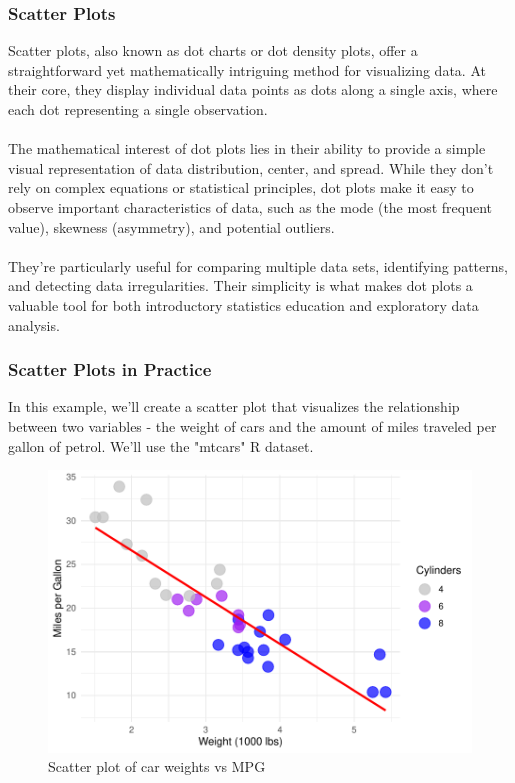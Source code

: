 \documentclass{article}\usepackage[]{graphicx}\usepackage[]{xcolor}
\makeatletter
\def\maxwidth{ %
  \ifdim\Gin@nat@width>\linewidth
    \linewidth
  \else
    \Gin@nat@width
  \fi
}
\newenvironment{kframe}{%
 \def\at@end@of@kframe{}%
 \ifinner\ifhmode%
  \def\at@end@of@kframe{\end{minipage}}%
  \begin{minipage}{\columnwidth}%
 \fi\fi%
 \def\FrameCommand##1{\hskip\@totalleftmargin \hskip-\fboxsep
 \colorbox{shadecolor}{##1}\hskip-\fboxsep
     \hskip-\linewidth \hskip-\@totalleftmargin \hskip\columnwidth}%
 \MakeFramed {\advance\hsize-\width
   \@totalleftmargin\z@ \linewidth\hsize
   \@setminipage}}%
 {\par\unskip\endMakeFramed%
 \at@end@of@kframe}
\newenvironment{knitrout}{}{} %
\makeatother
\begin{document}
\subsubsection{Scatter Plots}
Scatter plots, also known as dot charts or dot density plots, offer a straightforward yet mathematically intriguing method for visualizing data. At their core, they display individual data points as dots along a single axis, where each dot representing a single observation.\\ 
\\The mathematical interest of dot plots lies in their ability to provide a simple visual representation of data distribution, center, and spread. While they don't rely on complex equations or statistical principles, dot plots make it easy to observe important characteristics of data, such as the mode (the most frequent value), skewness (asymmetry), and potential outliers. \\ 
\\They're particularly useful for comparing multiple data sets, identifying patterns, and detecting data irregularities. Their simplicity is what makes dot plots a valuable tool for both introductory statistics education and exploratory data analysis.

\subsubsection{Scatter Plots in Practice}
In this example, we'll create a scatter plot that visualizes the relationship between two variables - the weight of cars and the amount of miles traveled per gallon of petrol. We'll use the "mtcars" R dataset.

\begin{knitrout}
\color{fgcolor}\begin{kframe}


{\ttfamily\noindent\itshape{}}\end{kframe}\begin{figure}
\includegraphics[width=\maxwidth]{figure/scatter-plot-1} \caption[Scatter plot of car weights vs MPG]{Scatter plot of car weights vs MPG}\label{fig:scatter-plot}
\end{figure}

\end{knitrout}
\end{document}
